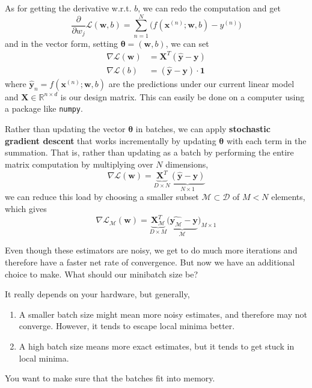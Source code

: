 \begin{example}
    As for getting the derivative w.r.t. $b$, we can redo the computation and get 
    \begin{equation}
      \frac{\partial}{\partial w_j}\mathcal{L}(\mathbf{w}, b) = \sum_{n=1}^N \big( f (\mathbf{x}^{(n)}; \mathbf{w}, b) - y^{(n)}\big) 
    \end{equation}
    and in the vector form, setting $\boldsymbol{\theta} = (\mathbf{w}, b)$, we can set 
    \begin{align}
      \nabla \mathcal{L} (\mathbf{w}) & = \mathbf{X}^T (\hat{\mathbf{y}} - \mathbf{y}) \\
      \nabla \mathcal{L} (b) & = (\hat{\mathbf{y}} - \mathbf{y}) \cdot \mathbf{1}
    \end{align}
    where $\hat{\mathbf{y}}_n = f(\mathbf{x}^{(n)}; \mathbf{w}, b)$ are the predictions under our current linear model and $\mathbf{X} \in \mathbb{R}^{n \times d}$ is our design matrix. This can easily be done on a computer using a package like \texttt{numpy}. 
    
    Rather than updating the vector $\boldsymbol{\theta}$ in batches, we can apply \textbf{stochastic gradient descent} that works incrementally by updating $\boldsymbol{\theta}$ with each term in the summation. That is, rather than updating as a batch by performing the entire matrix computation by multiplying over $N$ dimensions,
    \begin{equation}
      \nabla \mathcal{L} (\mathbf{w}) = \underbrace{\mathbf{X}^T}_{D \times N} \underbrace{(\hat{\mathbf{y}} - \mathbf{y})}_{N \times 1}
    \end{equation}
    we can reduce this load by choosing a smaller subset $\mathcal{M} \subset \mathcal{D}$ of $M < N$ elements, which gives 
    \begin{equation}
      \nabla \mathcal{L}_{\mathcal{M}} (\mathbf{w}) = \underbrace{\mathbf{X}_{\mathcal{M}}^T}_{D \times M} \underbrace{(\hat{\mathbf{y}_{\mathcal{M}}} - \mathbf{y}}_{\mathcal{M}})_{M \times 1}
    \end{equation}
  \end{example} 

  Even though these estimators are noisy, we get to do much more iterations and therefore have a faster net rate of convergence. But now we have an additional choice to make. What should our minibatch size be? 

  \begin{heuristic} 
    It really depends on your hardware, but generally, 
    \begin{enumerate}
      \item A smaller batch size might mean more noisy estimates, and therefore may not converge. However, it tends to escape local minima better. 
      \item A high batch size means more exact estimates, but it tends to get stuck in local minima.  
    \end{enumerate}
    You want to make sure that the batches fit into memory. 
  \end{heuristic}

